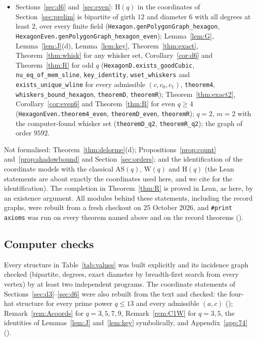 \documentclass[11pt]{amsart}
\theoremstyle{definition}
\theoremstyle{remark}
\newcommand{\Hq}{\mathrm{H}}
\newcommand{\AS}{\mathrm{AS}}
\newcommand{\Wq}{\mathrm{W}}
\begin{document}
{\begin{itemize}[leftmargin=1.5em]
\item Sections~\ref{sec:d6} and~\ref{sec:even}: $\Hq(q)$ in the coordinates of Section~\ref{sec:prelim} is bipartite of girth $12$ and diameter $6$ with all degrees at least $2$, over every finite field (\texttt{Hexagon.genPolygonGraph\_hexagon}, \texttt{HexagonEven.genPolygonGraph\_hexagon\_even}); Lemma~\ref{lem:G}, Lemma~\ref{lem:J}(d), Lemma~\ref{lem:key}, Theorem~\ref{thm:exact}, Theorem~\ref{thm:whisk} for any whisker set, Corollary~\ref{cor:d6} and Theorem~\ref{thm:R} for odd $q$ (\texttt{HexagonD.exists\_goodCubic}, \texttt{nu\_eq\_of\_mem\_sline}, \texttt{key\_identity}, \texttt{wset\_whiskers} and \texttt{exists\_unique\_wline} for every admissible $(c,c_0,c_1)$, \texttt{theorem4}, \texttt{whiskers\_bound\_hexagon}, \texttt{theoremD}, \texttt{theoremR}); Theorem~\ref{thm:exact2}, Corollary~\ref{cor:even6} and Theorem~\ref{thm:R} for even $q\ge4$ (\texttt{HexagonEven.theorem4\_even}, \texttt{theoremD\_even}, \texttt{theoremR}); $q=2$, $m=2$ with the computer-found whisker set (\texttt{theoremD\_q2}, \texttt{theoremR\_q2}); the graph of order $9592$.
\end{itemize}\par}
Not formalised: Theorem~\ref{thm:delorme}(d); Propositions~\ref{prop:count} and~\ref{prop:shadowbound} and Section~\ref{sec:orders}; and the identification of the coordinate models with the classical $\AS(q)$, $\Wq(q)$ and $\Hq(q)$ (the Lean statements are about exactly the coordinates used here, and we cite \cite{P71,PT,T59,VM98} for the identification). The completion in Theorem~\ref{thm:R} is proved in Lean, as here, by an existence argument. All modules behind these statements, including the record graphs, were rebuilt from a fresh checkout on 25 October 2026, and \texttt{\#print axioms} was run on every theorem named above and on the record theorems ().

\subsection{Computer checks}
Every structure in Table~\ref{tab:values} was built explicitly and its incidence graph checked (bipartite, degrees, exact diameter by breadth-first search from every vertex) by at least two independent programs. The coordinate statements of Sections~\ref{sec:d3}--\ref{sec:d6} were also rebuilt from the text and checked: the four-hat structure for every prime power $q\le13$ and every admissible $(a,c)$ (); Remark~\ref{rem:Acoords} for $q=3,5,7,9$, Remark~\ref{rem:C1W} for $q=3,5$, the identities of Lemmas~\ref{lem:J} and~\ref{lem:key} symbolically, and Appendix~\ref{app:74} ().
\end{document}
